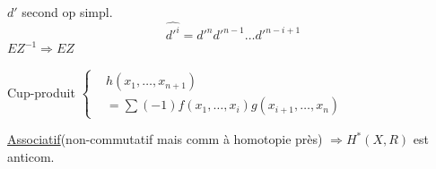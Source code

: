 \(d'\) second op simpl.
\[
\widehat{d'^{i}}=d'^{n}d'^{n-1}\ldots d'^{n-i+1}
\]
\(EZ^{-1}\Rightarrow EZ\)

Cup-produit \(\left\{\begin{aligned}
&h(x_1,\ldots,x_{n+1})\\
&=\sum(-1)f(x_1,\ldots,x_i)g(x_{i+1},\ldots,x_n)
\end{aligned}\right.\)

\uline{Associatif}\quad (non-commutatif mais comm à homotopie près) \(\Rightarrow H^*(X,R)\) est anticom.

